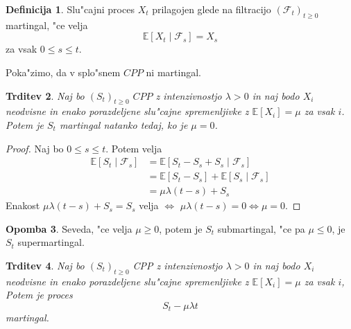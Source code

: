 \documentclass[12pt, a4paper, reqno]{amsart}
\theoremstyle{definition}
\newtheorem{definicija}{Definicija}[section]
\newtheorem{opomba}[definicija]{Opomba}
\theoremstyle{plain}
\newtheorem{trditev}[definicija]{Trditev}
\newcommand{\E}{\mathbb{E}}
\newcommand{\F}{\mathcal{F}}
\newcommand{\1}{\mathds{1}}
\begin{document}
        \begin{definicija}
            Slu"cajni proces $X_t$ prilagojen glede na filtracijo $(\F_t)_{t\geq0}$
            martingal, "ce velja 
            $$
                \E\left[X_t\mid\F_s\right] = X_s
            $$
            za vsak $0\leq s \leq t$.
            \label{def:martingal}
        \end{definicija}

        Poka"zimo, da v splo"snem $CPP$ ni martingal.

        \begin{trditev}
            Naj bo $(S_t)_{t\geq0}$ $CPP$ z intenzivnostjo $\lambda>0$ in naj bodo $X_i$ neodvisne
            in enako porazdeljene slu"cajne spremenljivke z $\E\left[X_i\right] = \mu$ za vsak $i$.
            Potem je $S_t$ martingal natanko tedaj, ko je $\mu = 0$.
            \label{trd:CPPnimartingal}
        \end{trditev}

        \begin{proof}
            Naj bo $0\leq s\leq t$. Potem velja
            \begin{align*}
                \E\left[S_t\mid\F_s\right] 
                        &= \E\left[S_t - S_s + S_s\mid \F_s\right] \\
                        &= \E\left[S_t - S_s\right] + \E\left[S_s\mid \F_s\right] \\
                        &= \mu\lambda(t-s) + S_s
            \end{align*}
           Enakost $\mu\lambda(t-s) + S_s = S_s$ velja $\iff$ $\mu\lambda(t-s) = 0 \iff \mu = 0$.
        \end{proof}

        \begin{opomba}
            Seveda, "ce velja $\mu \geq 0$, potem je $S_t$ submartingal, "ce pa $\mu \leq 0$, je
            $S_t$ supermartingal.
        \end{opomba}

        \begin{trditev}
            Naj bo $(S_t)_{t\geq0}$ CPP z intenzivnostjo $\lambda > 0$ in naj bodo $X_i$ neodvisne
            in enako porazdeljene slu"cajne spremenljivke z $\E\left[X_i\right] = \mu$ za vsak $i$,
            Potem je proces 
            $$
                S_t - \mu\lambda t
            $$
            martingal.
            \label{trd:CPPpostanemartingal}
        \end{trditev}
\end{document}
